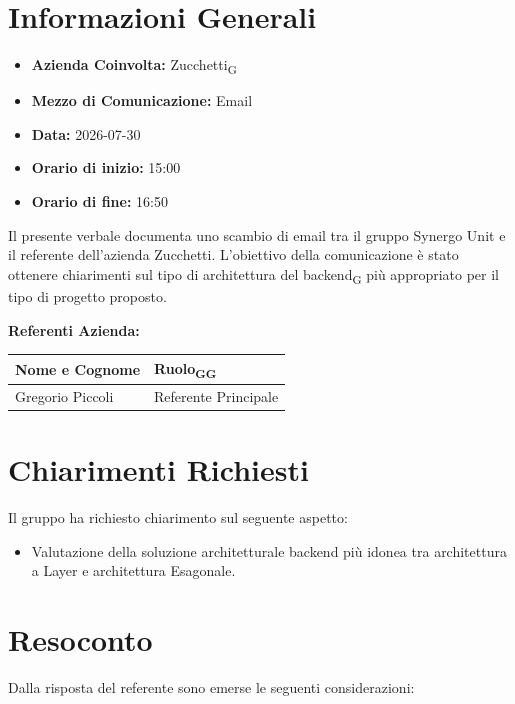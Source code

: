 \section{Informazioni Generali}
\begin{itemize}
	\item \textbf{Azienda Coinvolta:} Zucchetti\textsubscript{G}
	\item \textbf{Mezzo di Comunicazione:} Email
	\item \textbf{Data:} 2026-07-30
	\item \textbf{Orario di inizio:} 15:00
	\item \textbf{Orario di fine:} 16:50
\end{itemize}

Il presente verbale documenta uno scambio di email tra il gruppo Synergo Unit
e il referente dell'azienda Zucchetti.
L'obiettivo della comunicazione è stato ottenere chiarimenti sul tipo di architettura del backend\textsubscript{G} 
più appropriato per il tipo di progetto proposto.


\vspace{0.5cm}
\textbf{Referenti Azienda:}
\begin{table}[ht]
	\centering
	\renewcommand{\arraystretch}{1.2}
	\begin{tabularx}{\textwidth}{X l}
		\toprule
		\textbf{Nome e Cognome} & \textbf{Ruolo\textsubscript{G}\textsubscript{G}} \\
		\midrule
		Gregorio Piccoli & Referente Principale \\
		\bottomrule
	\end{tabularx}
\end{table}

\section{Chiarimenti Richiesti}
Il gruppo ha richiesto chiarimento sul seguente aspetto:

\begin{itemize}
	 \item Valutazione della soluzione architetturale backend più idonea tra 
	 architettura a Layer e architettura Esagonale.
\end{itemize}

\section{Resoconto}
Dalla risposta del referente sono emerse le seguenti considerazioni:

